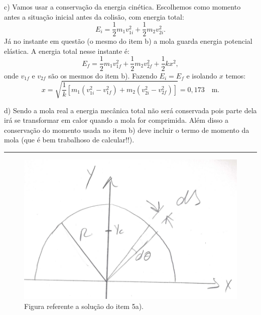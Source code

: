 \documentclass[12pt]{article}
\newenvironment{problem}[2][{\color{red}Problema}]{\begin{trivlist}
\item[\hskip \labelsep {\bfseries #1}\hskip \labelsep {\bfseries #2.}]}{\end{trivlist}}
\begin{document}
\begin{problem}{4}
\noindent
c) Vamos usar a conservação da energia cinética. Escolhemos como momento antes a situação inicial antes da colisão, com energia total:
\begin{equation}
E_i = \frac{1}{2} m_1 v_{1i}^2 + \frac{1}{2} m_2 v_{2i}^2. \nonumber
\end{equation}
Já no instante em questão (o mesmo do item b) a mola guarda energia potencial elástica. A energia total nesse instante é:
\begin{equation}
E_f = \frac{1}{2} m_1 v_{1f}^2 + \frac{1}{2} m_2 v_{2f}^2 + \frac{1}{2}kx^2, \nonumber
\end{equation}
onde $v_{1f}$ e $v_{2f}$ são os mesmos do item b). Fazendo $E_i=E_f$ e isolando $x$ temos:
{\color{red}
\begin{equation}
x = \sqrt{ \dfrac{1}{k} \left[  m_1 ( v_{1i}^2 - v_{1f}^2)  + m_2 (v_{2i}^2 - v_{2f}^2) \right] } = 0,173 \quad \text{m}. \nonumber
\end{equation}}
\end{problem}

\noindent
d) Sendo a mola real a energia mecânica total não será conservada pois parte dela irá se transformar em calor quando a mola for comprimida. Além disso a conservação do momento usada no item b) deve incluir o termo de momento da mola (que é bem trabalhoso de calcular!!).

\begin{center}
\noindent\rule{13cm}{0.5pt}
\end{center}

\begin{figure}
\centering
\includegraphics[width=3.5 in]{figuras/barra_geometria.png}
\caption{Figura referente a solução do item 5a).}
\label{barra_geometria}
\end{figure}
\end{document}
